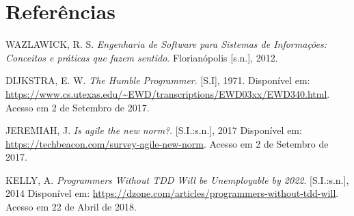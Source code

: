 \documentclass[
    12pt,       %
    openright,      %
    twoside,      %
    a4paper,      %
    english,      %
    french,       %
    spanish,      %
    brazil,       %
    ]{abntex2}
\begin{document}









  \postextual


  
  \chapter*{Referências}
  \noindent
  WAZLAWICK, R. S. \textit{Engenharia de Software para Sistemas de Informações: Conceitos e práticas que fazem sentido}. Florianópolis [s.n.], 2012.

  \noindent
  DIJKSTRA, E. W. \textit{The Humble Programmer}. [S.I], 1971. Disponível em:
  \url{https://www.cs.utexas.edu/~EWD/transcriptions/EWD03xx/EWD340.html}.
  Acesso em 2 de Setembro de 2017.

  \noindent
  JEREMIAH, J. \textit{Is agile the new norm?}. [S.I.:s.n.], 2017 Disponível em:
  \url{https://techbeacon.com/survey-agile-new-norm}. Acesso em 2 de Setembro de 2017.

  \noindent
  KELLY, A. \textit{Programmers Without TDD Will be Unemployable by 2022}. [S.I.:s.n.],
  2014 Disponível em: \url{https://dzone.com/articles/programmers-without-tdd-will}. Acesso em 22 de Abril de 2018.
\end{document}
